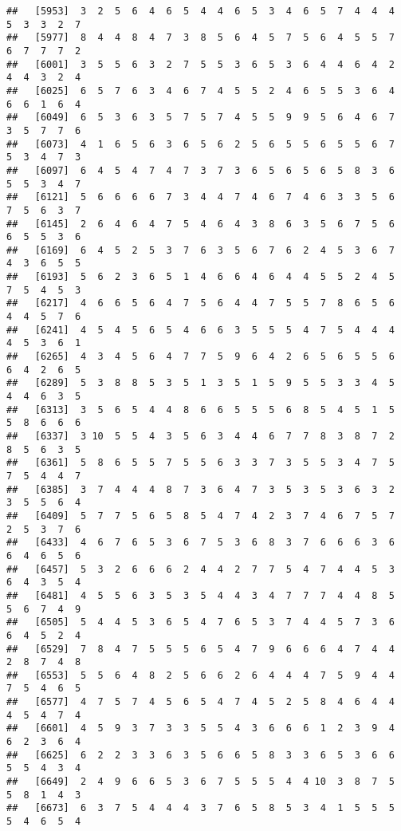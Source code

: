 \documentclass[
]{book}
\begin{document}
\begin{verbatim}
##   [5953]  3  2  5  6  4  6  5  4  4  6  5  3  4  6  5  7  4  4  4  5  3  3  2  7
##   [5977]  8  4  4  8  4  7  3  8  5  6  4  5  7  5  6  4  5  5  7  6  7  7  7  2
##   [6001]  3  5  5  6  3  2  7  5  5  3  6  5  3  6  4  4  6  4  2  4  4  3  2  4
##   [6025]  6  5  7  6  3  4  6  7  4  5  5  2  4  6  5  5  3  6  4  6  6  1  6  4
##   [6049]  6  5  3  6  3  5  7  5  7  4  5  5  9  9  5  6  4  6  7  3  5  7  7  6
##   [6073]  4  1  6  5  6  3  6  5  6  2  5  6  5  5  6  5  5  6  7  5  3  4  7  3
##   [6097]  6  4  5  4  7  4  7  3  7  3  6  5  6  5  6  5  8  3  6  5  5  3  4  7
##   [6121]  5  6  6  6  6  7  3  4  4  7  4  6  7  4  6  3  3  5  6  7  5  6  3  7
##   [6145]  2  6  4  6  4  7  5  4  6  4  3  8  6  3  5  6  7  5  6  6  5  5  3  6
##   [6169]  6  4  5  2  5  3  7  6  3  5  6  7  6  2  4  5  3  6  7  4  3  6  5  5
##   [6193]  5  6  2  3  6  5  1  4  6  6  4  6  4  4  5  5  2  4  5  7  5  4  5  3
##   [6217]  4  6  6  5  6  4  7  5  6  4  4  7  5  5  7  8  6  5  6  4  4  5  7  6
##   [6241]  4  5  4  5  6  5  4  6  6  3  5  5  5  4  7  5  4  4  4  4  5  3  6  1
##   [6265]  4  3  4  5  6  4  7  7  5  9  6  4  2  6  5  6  5  5  6  6  4  2  6  5
##   [6289]  5  3  8  8  5  3  5  1  3  5  1  5  9  5  5  3  3  4  5  4  4  6  3  5
##   [6313]  3  5  6  5  4  4  8  6  6  5  5  5  6  8  5  4  5  1  5  5  8  6  6  6
##   [6337]  3 10  5  5  4  3  5  6  3  4  4  6  7  7  8  3  8  7  2  8  5  6  3  5
##   [6361]  5  8  6  5  5  7  5  5  6  3  3  7  3  5  5  3  4  7  5  7  5  4  4  7
##   [6385]  3  7  4  4  4  8  7  3  6  4  7  3  5  3  5  3  6  3  2  3  5  5  6  4
##   [6409]  5  7  7  5  6  5  8  5  4  7  4  2  3  7  4  6  7  5  7  2  5  3  7  6
##   [6433]  4  6  7  6  5  3  6  7  5  3  6  8  3  7  6  6  6  3  6  6  4  6  5  6
##   [6457]  5  3  2  6  6  6  2  4  4  2  7  7  5  4  7  4  4  5  3  6  4  3  5  4
##   [6481]  4  5  5  6  3  5  3  5  4  4  3  4  7  7  7  4  4  8  5  5  6  7  4  9
##   [6505]  5  4  4  5  3  6  5  4  7  6  5  3  7  4  4  5  7  3  6  6  4  5  2  4
##   [6529]  7  8  4  7  5  5  5  6  5  4  7  9  6  6  6  4  7  4  4  2  8  7  4  8
##   [6553]  5  5  6  4  8  2  5  6  6  2  6  4  4  4  7  5  9  4  4  7  5  4  6  5
##   [6577]  4  7  5  7  4  5  6  5  4  7  4  5  2  5  8  4  6  4  4  4  5  4  7  4
##   [6601]  4  5  9  3  7  3  3  5  5  4  3  6  6  6  1  2  3  9  4  6  2  3  6  4
##   [6625]  6  2  2  3  3  6  3  5  6  6  5  8  3  3  6  5  3  6  6  5  5  4  3  4
##   [6649]  2  4  9  6  6  5  3  6  7  5  5  5  4  4 10  3  8  7  5  5  8  1  4  3
##   [6673]  6  3  7  5  4  4  4  3  7  6  5  8  5  3  4  1  5  5  5  5  4  6  5  4

\end{verbatim}
\end{document}
